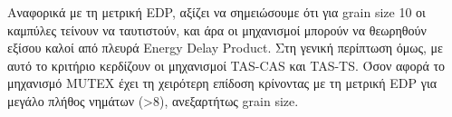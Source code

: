 Αναφορικά με τη μετρική EDP, αξίζει να σημειώσουμε ότι για grain size 10 οι
καμπύλες τείνουν να ταυτιστούν, και άρα οι μηχανισμοί μπορούν να θεωρηθούν
εξίσου καλοί από πλευρά Energy Delay Product. Στη γενική περίπτωση όμως, με αυτό
το κριτήριο κερδίζουν οι μηχανισμοί TAS-CAS και TAS-TS. Όσον αφορά το μηχανισμό
MUTEX έχει τη χειρότερη επίδοση κρίνοντας με τη μετρική EDP για μεγάλο πλήθος
νημάτων (>8), ανεξαρτήτως grain size.
